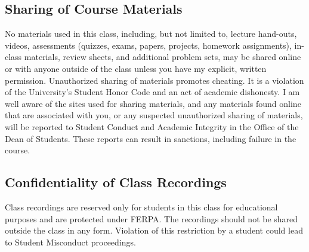 \documentclass[11pt,fourier]{article}
\begin{document}
	\subsection*{Sharing of Course Materials}
	No materials used in this class, including, but not limited to, lecture hand-outs, videos, assessments (quizzes, exams, papers, projects, homework assignments), in-class materials, review sheets, and additional problem sets, may be shared online or with anyone outside of the class unless you have my explicit, written permission. Unauthorized sharing of materials promotes cheating. It is a violation of the University's Student Honor Code and an act of academic dishonesty. I am well aware of the sites used for sharing materials, and any materials found online that are associated with you, or any suspected unauthorized sharing of materials, will be reported to Student Conduct and Academic Integrity in the Office of the Dean of Students. These reports can result in sanctions, including failure in the course.
	
	\subsection*{Confidentiality of Class Recordings}
	Class recordings are reserved only for students in this class for educational purposes and are protected under FERPA. The recordings should not be shared outside the class in any form. Violation of this restriction by a student could lead to Student Misconduct proceedings.
	
\end{document}

